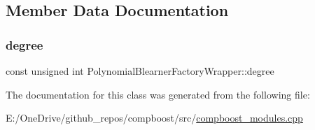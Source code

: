 \subsection{Member Data Documentation}
\mbox{\label{class_polynomial_blearner_factory_wrapper_aae00b359ac0ee8cfefb99ddfc5192fa6}} 
\subsubsection{\texorpdfstring{degree}{degree}}
{\footnotesize\ttfamily const unsigned int Polynomial\+Blearner\+Factory\+Wrapper\+::degree\hspace{0.3cm}{\ttfamily [private]}}



The documentation for this class was generated from the following file\+:\begin{DoxyCompactItemize}
\item 
E\+:/\+One\+Drive/github\+\_\+repos/compboost/src/\mbox{\hyperlink{compboost__modules_8cpp}{compboost\+\_\+modules.\+cpp}}\end{DoxyCompactItemize}
